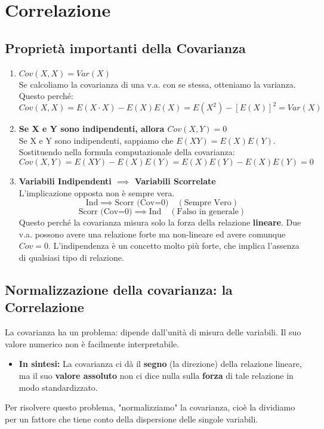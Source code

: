 \documentclass[a4paper, 11pt]{article}
\theoremstyle{definition}
\begin{document}
\section{Correlazione}
\subsection{Proprietà importanti della Covarianza}
\begin{enumerate}
    \item \textbf{$Cov(X,X) = Var(X)$} \\
    Se calcoliamo la covarianza di una v.a. con se stessa, otteniamo la varianza. Questo perché:
    \[ Cov(X,X) = E(X \cdot X) - E(X)E(X) = E(X^2) - [E(X)]^2 = Var(X) \]

    \item \textbf{Se X e Y sono indipendenti, allora $Cov(X,Y) = 0$} \\
    Se X e Y sono indipendenti, sappiamo che $E(XY) = E(X)E(Y)$. Sostituendo nella formula computazionale della covarianza:
    \[ Cov(X,Y) = E(XY) - E(X)E(Y) = E(X)E(Y) - E(X)E(Y) = 0 \]

    \item \textbf{Variabili Indipendenti $\implies$ Variabili Scorrelate} \\
    L'implicazione opposta non è sempre vera.
    \[ \text{Ind} \implies \text{Scorr (Cov=0)} \quad (\text{Sempre Vero}) \]
    \[ \text{Scorr (Cov=0)} \implies \text{Ind} \quad (\text{Falso in generale}) \]
    Questo perché la covarianza misura solo la forza della relazione \textbf{lineare}. Due v.a. possono avere una relazione forte ma non-lineare ed avere comunque $Cov=0$. L'indipendenza è un concetto molto più forte, che implica l'assenza di qualsiasi tipo di relazione.
\end{enumerate}

\subsection{Normalizzazione della covarianza: la Correlazione}
La covarianza ha un problema: dipende dall'unità di misura delle variabili. Il suo valore numerico non è facilmente interpretabile.
\begin{itemize}
    \item \textbf{In sintesi:} La covarianza ci dà il \textbf{segno} (la direzione) della relazione lineare, ma il suo \textbf{valore assoluto} non ci dice nulla sulla \textbf{forza} di tale relazione in modo standardizzato.
\end{itemize}
Per risolvere questo problema, "normalizziamo" la covarianza, cioè la dividiamo per un fattore che tiene conto della dispersione delle singole variabili.
\end{document}

